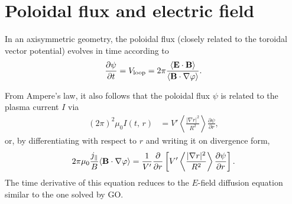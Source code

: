 \documentclass[11pt,a4paper]{article}
\newcommand{\sub}[1]{\ensuremath{_{\text{#1}}}}
\renewcommand{\b}[1]{\ensuremath{ {\bf #1 } }}
\begin{document}



\section{Poloidal flux and electric field}
In an axisymmetric geometry, the poloidal flux (closely related to the toroidal vector potential) evolves in time according to
\begin{align}
\frac{\partial \psi}{\partial t} = V\sub{loop} = 2\pi \frac{\langle \b{E}\cdot\b{B} \rangle }{\left\langle \b{B}\cdot\nabla \varphi \right\rangle } .
\label{eq:poloidal flux evolution}
\end{align}

From Ampere's law, it also follows that the poloidal flux $\psi$ is related to the plasma current $I$ via
\begin{align}
(2\pi)^2 \mu_0 I(t,\,r) &= V'\left\langle \frac{|\nabla r|^2}{R^2}\right\rangle \frac{\partial \psi}{\partial r},
\end{align}
or, by differentiating with respect to $r$ and writing it on divergence form,
\begin{align}
2\pi \mu_0 \frac{j_\parallel}{B} \langle \b{B}\cdot\nabla\varphi\rangle = \frac{1}{V'}\frac{\partial }{\partial r}\left[V'\left\langle \frac{|\nabla r|^2}{R^2}\right\rangle \frac{\partial \psi}{\partial r}\right].
\end{align}
The time derivative of this equation reduces to the $E$-field diffusion equation similar to the one solved by GO.
\end{document}
